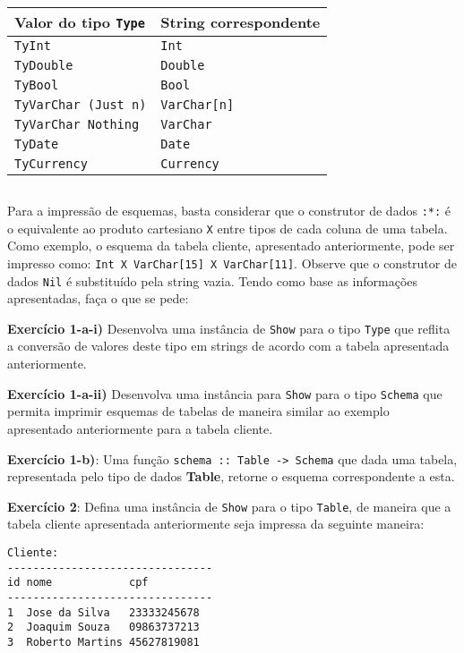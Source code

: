 \documentclass[11pt,a4paper]{report}
\begin{document}
 
\begin{tabular}{|l|l|}
 	\hline
 	   Valor do tipo \texttt{Type} & String correspondente\\ \hline
 	   \texttt{TyInt}              & \texttt{Int}\\
 	   \texttt{TyDouble}           & \texttt{Double}\\
 	   \texttt{TyBool}             & \texttt{Bool}\\
 	   \texttt{TyVarChar (Just n)} & \texttt{VarChar[n]}\\
 	   \texttt{TyVarChar Nothing}  & \texttt{VarChar}\\
 	   \texttt{TyDate}             & \texttt{Date}\\
 	   \texttt{TyCurrency}         & \texttt{Currency}\\
 	\hline
\end{tabular}
\begin{verbatim}

\end{verbatim} 

Para a impress\~ao de esquemas, basta considerar que o construtor de dados \texttt{:*:} \'e o equivalente ao produto
cartesiano \texttt{X} entre tipos de cada coluna de uma tabela. Como exemplo, o esquema da tabela cliente, apresentado 
anteriormente, pode ser impresso como: \texttt{Int X VarChar[15] X VarChar[11]}. Observe que o construtor de dados 
\texttt{Nil} \'e substitu\'ido pela string vazia. Tendo como base as informa\c{c}\~oes apresentadas, fa\c{c}a o que se
pede:

\textbf{Exerc\'icio 1-a-i)} Desenvolva uma inst\^ancia de \texttt{Show} para o tipo \texttt{Type} que reflita a 
convers\~ao de valores deste tipo em strings de acordo com a tabela apresentada anteriormente.

\textbf{Exerc\'icio 1-a-ii)} Desenvolva uma inst\^ancia para \texttt{Show} para o tipo \texttt{Schema} que permita
imprimir esquemas de tabelas de maneira similar ao exemplo apresentado anteriormente para a tabela cliente.


\textbf{Exerc\'icio 1-b)}: Uma fun\c{c}\~ao \texttt{schema :: Table -> Schema} que dada uma tabela, representada pelo 
tipo de dados \textbf{Table}, retorne o esquema correspondente a esta. 

\textbf{Exerc\'icio 2}: Defina uma inst\^ancia de \texttt{Show} para o tipo \texttt{Table}, de maneira que a tabela 
cliente apresentada anteriormente seja impressa da seguinte maneira:
\begin{verbatim}
Cliente:
--------------------------------
id nome            cpf         
--------------------------------
1  Jose da Silva   23333245678 
2  Joaquim Souza   09863737213 
3  Roberto Martins 45627819081 
\end{verbatim}
\end{document}
